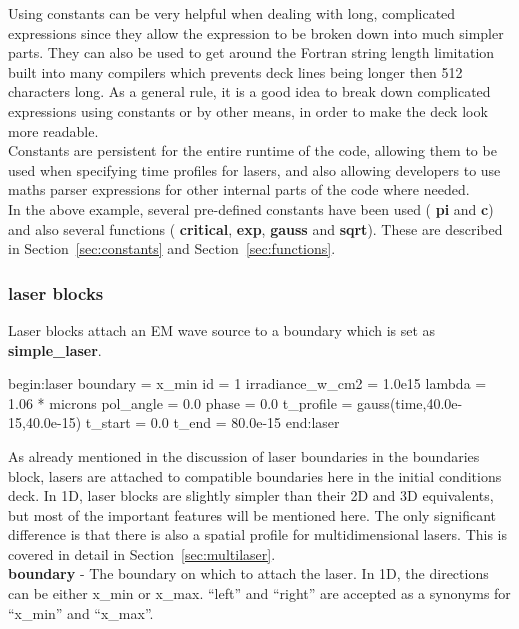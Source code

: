 \documentclass[12pt,a4paper]{article}
\newcommand{\emphtext}{\color{warwickdark} \fontfamily{phv}\selectfont\large\bf}
\newcommand{\sect}[1]{Section~\ref{sec:#1}}
\newcommand{\inlineemph}[1]{{\color{warwicklight} \bf{#1}}}
\newenvironment{lboxverbatim}[1]{
\setlength{\FrameSep}{0pt}
\def\FrameCommand{\fboxsep=0pt \colorbox{shadecolor}}
\MakeFramed{\FrameRestore}
\vspace{-13.5pt}
\fvset{label=#1}
\boxverb
}{
\endboxverb
\vspace{-13.5pt}
\endMakeFramed
}
\begin{document}
Using constants can be very helpful when dealing with long,
complicated expressions since they allow the expression to be broken down into
much simpler parts. They can also be used to get around the Fortran string
length limitation built into many compilers which prevents deck lines being
longer then 512 characters long. As a general rule, it is a good idea to break
down complicated expressions using constants or by other means, in order to
make the deck look more readable.\\

Constants are persistent for the entire runtime of the code,
allowing them to be used when specifying time profiles for lasers, and also
allowing developers to use maths parser expressions for other internal parts of
the code where needed.\\

In the above example, several pre-defined constants have been used
(\inlineemph{pi} and \inlineemph{c}) and also several functions
(\inlineemph{critical}, \inlineemph{exp}, \inlineemph{gauss} and
\inlineemph{sqrt}). These are described in \sect{constants} and
\sect{functions}.

\subsubsection{\inlineemph{laser} blocks}
\label{sec:lasers}
Laser blocks attach an EM wave source to a boundary which is set as
\inlineemph{simple\_laser}.

\begin{lboxverbatim}{laser block}
begin:laser
   boundary = x_min
   id = 1
   irradiance_w_cm2 = 1.0e15
   lambda = 1.06 * microns
   pol_angle = 0.0
   phase = 0.0
   t_profile = gauss(time,40.0e-15,40.0e-15)
   t_start = 0.0
   t_end = 80.0e-15
end:laser
\end{lboxverbatim}

As already mentioned in the discussion of laser boundaries in the boundaries
block, lasers are attached to compatible boundaries here in the initial
conditions deck. In 1D, laser blocks are slightly simpler than their 2D and 3D
equivalents, but most of the important features will be mentioned here. The
only significant difference is that there is also a spatial profile for
multidimensional lasers. This is covered in detail in
\sect{multilaser}.\\

{\emphtext boundary} - The boundary on which to attach the laser.
In 1D, the directions can be either x\_min or x\_max.  ``left'' and ``right''
are accepted as a synonyms for ``x\_min'' and ``x\_max''.\\
\end{document}
